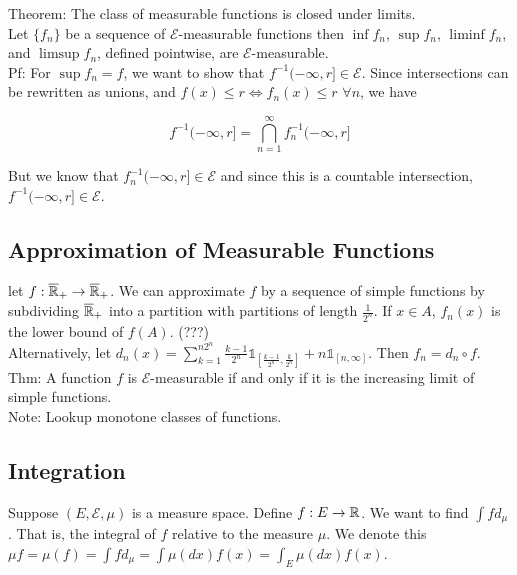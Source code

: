 \documentclass[english, 11pt]{article}
\begin{document}
Theorem: The class of measurable functions is closed under limits.\\

Let $\{f_n\}$ be a sequence of $\mathcal{E}$-measurable functions then $\inf f_n$, $\sup f_n$, $\liminf f_n$, and $\limsup f_n$, defined pointwise, are $\mathcal{E}$-measurable.\\

Pf: For $\sup f_n = f$, we want to show that $f^{-1}(-\infty, r] \in \mathcal{E}$. Since intersections can be rewritten as unions, and $f(x) \leq r \iff f_n(x) \leq r$ $\forall n$, we have

\[f^{-1}(-\infty, r] = \bigcap^\infty_{n=1} f^{-1}_n(-\infty, r]\]

But we know that $f^{-1}_n(-\infty, r] \in \mathcal{E}$ and since this is a countable intersection, $f^{-1}(-\infty, r] \in \mathcal{E}$.

\subsection{Approximation of Measurable Functions}

let $f: \overline{{\mathbb{R}}}_+ \to \overline{{\mathbb{R}}}_+$. We can approximate $f$ by a sequence of simple functions by subdividing $\overline{{\mathbb{R}}}_+$ into a partition with partitions of length $\frac{1}{2^n}$. If $x \in A$, $f_n(x)$ is the lower bound of $f(A)$. (???)\\

Alternatively, let $d_n(x) = \sum_{k = 1}^{n2^n} \frac{k-1}{2^n} \mathbb{1}_{[\frac{k-1}{2^n}, \frac{k}{2^n}]} + n \mathbb{1}_{[n, \infty]}$. Then $f_n = d_n \circ f$.\\

Thm: A function $f$ is $\mathcal{E}$-measurable if and only if it is the increasing limit of simple functions.\\

Note: Lookup monotone classes of functions.

\subsection{Integration}

Suppose $(E, \mathcal{E}, \mu)$ is a measure space. Define $f: E \to {\mathbb{R}}$. We want to find $\int f d_\mu$. That is, the integral of $f$ relative to the measure $\mu$. We denote this $\mu f = \mu(f) = \int f d_\mu = \int \mu(dx)f(x) = \int_E \mu(dx) f(x)$.\\
\end{document}
